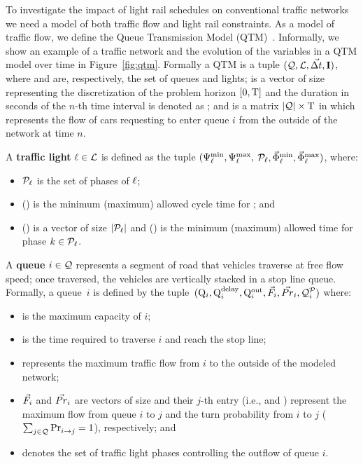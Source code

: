 To investigate the impact of light rail schedules on conventional
traffic networks we need a model of both traffic flow and light rail
constraints.  As a model of traffic flow, we define the Queue
Transmission Model (QTM)~\cite{trbPaperToAppear}.  Informally, we show an example of a traffic
network and the evolution of the variables in a QTM model over time
in Figure~\ref{fig:qtm}.  Formally a QTM is a tuple $(\mathcal{Q}, \mathcal{L},
\vec{\Delta t}, \mathbf{I})$, where \Qset and \Lset are, respectively, the set of
queues and lights;
%
\vecDT is a vector of size \Nn representing the discretization of the problem
horizon $[0,\mathrm{T}]$ and the duration in seconds of the $n$-th
time interval is denoted as \DT[n];
%
%
and \MatQIN is a matrix $|\mathcal{Q}| \times \mathrm{T}$ in which  represents
the flow of cars requesting to enter queue $i$ from the outside of the network
at time $n$.



A \textbf{traffic light} $\ell \in \mathcal{L}$ is defined as the tuple $(\mathrm{\Psi}_{\ell}^{\mathrm{min}},
\mathrm{\Psi}_{\ell}^{\mathrm{max}},$ $\mathcal{P}_\ell, \vec{\mathrm{\Phi}}_{\ell}^{\mathrm{min}}, \vec{\mathrm{\Phi}}_{\ell}^{\mathrm{max}})$, where:
%
\begin{itemize}
%
\item $\mathcal{P}_\ell$ is the set of phases of $\ell$;
%
\item \CTMIN{\tl} (\CTMAX{\tl}) is the minimum (maximum) allowed cycle time for
\tl; and
%
\item \VecPTMIN{\tl} (\VecPTMAX{\tl}) is a vector of size $|\mathcal{P}_\ell|$ and
   () is the minimum (maximum) allowed time for
  phase $k \in \mathcal{P}_\ell$. 
%
\end{itemize}


A \textbf{queue} $i \in \mathcal{Q}$ represents a segment of road that vehicles
traverse at free flow speed; once traversed, the vehicles are vertically stacked
in a stop line queue.
%
Formally, a queue~$i$ is defined by the tuple~$(\mathrm{Q}_{i}, \mathrm{Q}_{i}^{\mathrm{delay}}, \mathrm{Q}_{i}^{\mathrm{out}},
\vec{F}_i, \vec{Pr}_i, \mathcal{Q}_{i}^{\mathcal{P}})$ where:
%
\begin{itemize}
%
\item {} is the maximum capacity of $i$;
%
\item {} is the time required to traverse $i$ and reach the stop line;
%
\item {} represents the maximum traffic flow from $i$ to the outside of
  the modeled network;
%
\item $\vec{F}_i$ and $\vec{Pr}_i$ are vectors of size \Qn and their $j$-th entry
  (i.e.,  and ) represent the maximum flow from queue $i$
  to $j$ and the turn probability from $i$ to $j$ ($\sum_{j \in
  \mathcal{Q}}\mathrm{Pr}_{i\to j}^{\mathrm{}} = 1$), respectively; and
%
\item {} denotes the set of traffic light phases controlling the outflow
  of queue $i$.
%
\end{itemize}


